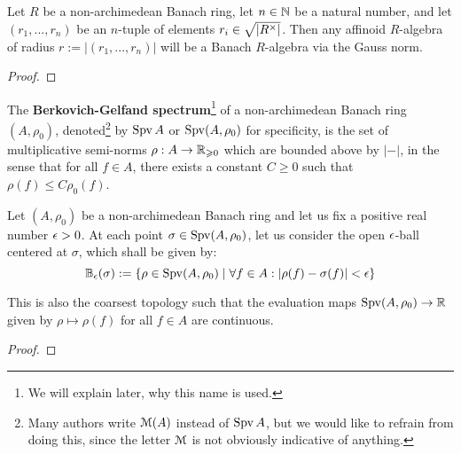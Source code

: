             \begin{proposition} \label{prop: generalised_affinoid_algebras_are_banach_algebras}
                Let $R$ be a non-archimedean Banach ring, let $n \in \mathbb{N}$ be a natural number, and let $(r_1, ..., r_n)$ be an $n$-tuple of elements $r_i \in \sqrt{|R^{\x}|}$. Then any affinoid $R$-algebra of radius $r := |(r_1, ..., r_n)|$ will be a Banach $R$-algebra via the Gauss norm.
            \end{proposition}
                \begin{proof}
                    
                \end{proof}
                
            \begin{definition} \label{def: Berkovich-Gelfand_spectra_of_non_archimedean_banach_rings}
                The \textbf{Berkovich-Gelfand spectrum}\footnote{We will explain later, why this name is used.} of a non-archimedean Banach ring $(A, \rho_0)$, denoted\footnote{Many authors write $\mathcal{M}(A)$ instead of $\operatorname{Spv} A$, but we would like to refrain from doing this, since the letter $\mathcal{M}$ is not obviously indicative of anything.} by $\operatorname{Spv} A$ or $\operatorname{Spv} (A, \rho_0)$ for specificity, is the set of multiplicative semi-norms $\rho: A \to \mathbb{R}_{\geqslant 0}$ which are bounded above by $|-|$, in the sense that for all $f \in A$, there exists a constant $C \geq 0$ such that $\rho(f) \leq C \rho_0(f)$.
            \end{definition}
            \begin{proposition} \label{prop: topology_on_Berkovich-Gelfand_spectra_of_non_archimedean_baanch_rings}
                Let $(A, \rho_0)$ be a non-archimedean Banach ring and let us fix a positive real number $\epsilon > 0$. At each point $\sigma \in \operatorname{Spv}(A, \rho_0)$, let us consider the open $\epsilon$-ball centered at $\sigma$, which shall be given by:
                    $$\mathbb{B}_{\epsilon}(\sigma) := \{\rho \in \operatorname{Spv}(A, \rho_0) \mid \forall f \in A: |\rho(f) - \sigma(f)| < \epsilon\}$$
                
                This is also the coarsest topology such that the evaluation maps $\operatorname{Spv}(A, \rho_0) \to \mathbb{R}$ given by $\rho \mapsto \rho(f)$ for all $f \in A$ are continuous.     
            \end{proposition}
                \begin{proof}
                    
                \end{proof}
        
